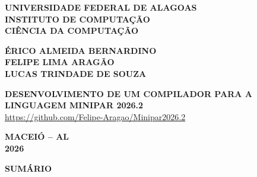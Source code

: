 \documentclass[
  12pt,
  openany,
  oneside,
  a4paper,
  brazilian
]{abntex2}
\renewcommand{\ABNTEXchapterfont}{\rmfamily\bfseries}
\begin{document}
\frenchspacing

\pagestyle{empty}

\begin{capa}
    \centering
    {\ABNTEXchapterfont\bfseries\normalsize UNIVERSIDADE FEDERAL DE ALAGOAS}\\[0.2cm]
    {\ABNTEXchapterfont\bfseries\normalsize INSTITUTO DE COMPUTAÇÃO}\\[0.2cm]
    {\ABNTEXchapterfont\bfseries\normalsize CIÊNCIA DA COMPUTAÇÃO}

    \vspace{3.5cm}

    {\normalsize\bfseries ÉRICO ALMEIDA BERNARDINO}\\[0.2cm]
    {\normalsize\bfseries FELIPE LIMA ARAGÃO}\\[0.2cm]
    {\normalsize\bfseries LUCAS TRINDADE DE SOUZA}

    \vspace{4.0cm}

    {\ABNTEXchapterfont\bfseries\normalsize DESENVOLVIMENTO DE UM COMPILADOR PARA A LINGUAGEM MINIPAR 2026.2}\\[0.6cm]
    {\normalsize\url{https://github.com/Felipe-Aragao/Minipar2026.2}}

    \vfill
    {\normalsize\bfseries MACEIÓ -- AL}\\[0.2cm]
    {\normalsize\bfseries 2026}
\end{capa}

\clearpage
{}
\begin{center}
    {\ABNTEXchapterfont\bfseries\normalsize SUMÁRIO}
\end{center}
\vspace{0.5cm}
\tableofcontents*
\clearpage

\textual
\pagestyle{simple}

















\end{document}
